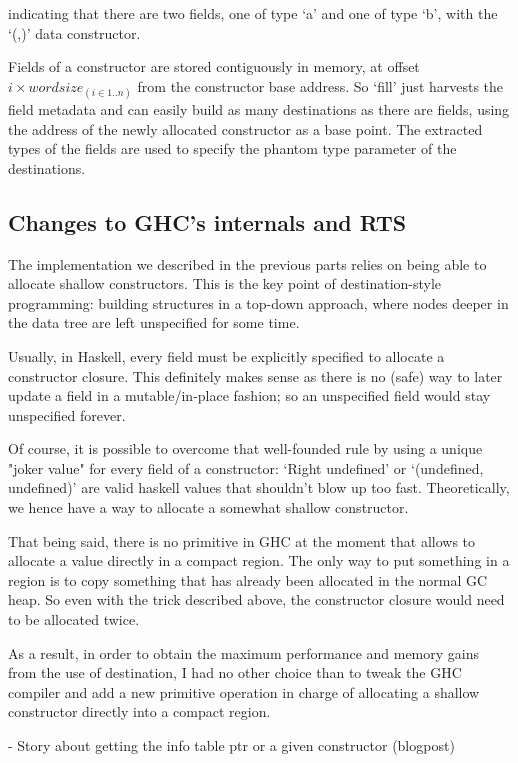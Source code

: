 \documentclass[english]{jflart}
\begin{document}
indicating that there are two fields, one of type `a' and one of type `b', with the `(,)' data constructor.

Fields of a constructor are stored contiguously in memory, at offset $i \times \textit{wordsize}_{(i \in 1..n)}$ from the constructor base address. So `fill' just harvests the field metadata and can easily build as many destinations as there are fields, using the address of the newly allocated constructor as a base point. The extracted types of the fields are used to specify the phantom type parameter of the destinations.

\subsection{Changes to GHC's internals and RTS}

The implementation we described in the previous parts relies on being able to allocate shallow constructors. This is the key point of destination-style programming: building structures in a top-down approach, where nodes deeper in the data tree are left unspecified for some time.

Usually, in Haskell, every field must be explicitly specified to allocate a constructor closure. This definitely makes sense as there is no (safe) way to later update a field in a mutable/in-place fashion; so an unspecified field would stay unspecified forever.

Of course, it is possible to overcome that well-founded rule by using a unique "joker value" for every field of a constructor: `Right undefined' or `(undefined, undefined)' are valid haskell values that shouldn't blow up too fast. Theoretically, we hence have a way to allocate a somewhat shallow constructor.

That being said, there is no primitive in GHC at the moment that allows to allocate a value directly in a compact region. The only way to put something in a region is to copy something that has already been allocated in the normal GC heap. So even with the trick described above, the constructor closure would need to be allocated twice.

As a result, in order to obtain the maximum performance and memory gains from the use of destination, I had no other choice than to tweak the GHC compiler and add a new primitive operation in charge of allocating a shallow constructor directly into a compact region.

- Story about getting the info table ptr or a given constructor (blogpost)
\end{document}
